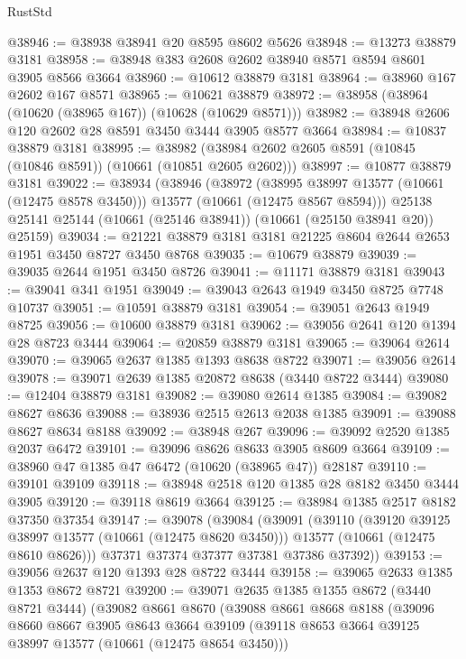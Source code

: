 \begin{lexlean}{RustStd}
\begin{coremodule}
@38946 := @38938 @38941 @20 @8595 @8602 @5626
@38948 := @13273 @38879 @3181
@38958 := @38948 @383 @2608 @2602 @38940 @8571 @8594 @8601 @3905 @8566 @3664
@38960 := @10612 @38879 @3181
@38964 := @38960 @167 @2602 @167 @8571
@38965 := @10621 @38879
@38972 := @38958 (@38964 (@10620 (@38965 @167)) (@10628 (@10629 @8571)))
@38982 := @38948 @2606 @120 @2602 @28 @8591 @3450 @3444 @3905 @8577 @3664
@38984 := @10837 @38879 @3181
@38995 := @38982 (@38984 @2602 @2605 @8591 (@10845 (@10846 @8591)) (@10661 (@10851 @2605 @2602)))
@38997 := @10877 @38879 @3181
@39022 := @38934
    (@38946
      (@38972
        (@38995 @38997 @13577 (@10661 (@12475 @8578 @3450)))
        @13577
        (@10661 (@12475 @8567 @8594)))
      @25138
      @25141
      @25144
      (@10661 (@25146 @38941))
      (@10661 (@25150 @38941 @20))
      @25159)
@39034 := @21221 @38879 @3181 @3181 @21225 @8604 @2644 @2653 @1951 @3450 @8727 @3450 @8768
@39035 := @10679 @38879
@39039 := @39035 @2644 @1951 @3450 @8726
@39041 := @11171 @38879 @3181
@39043 := @39041 @341 @1951
@39049 := @39043 @2643 @1949 @3450 @8725 @7748 @10737
@39051 := @10591 @38879 @3181
@39054 := @39051 @2643 @1949 @8725
@39056 := @10600 @38879 @3181
@39062 := @39056 @2641 @120 @1394 @28 @8723 @3444
@39064 := @20859 @38879 @3181
@39065 := @39064 @2614
@39070 := @39065 @2637 @1385 @1393 @8638 @8722
@39071 := @39056 @2614
@39078 := @39071 @2639 @1385 @20872 @8638 (@3440 @8722 @3444)
@39080 := @12404 @38879 @3181
@39082 := @39080 @2614 @1385
@39084 := @39082 @8627 @8636
@39088 := @38936 @2515 @2613 @2038 @1385
@39091 := @39088 @8627 @8634 @8188
@39092 := @38948 @267
@39096 := @39092 @2520 @1385 @2037 @6472
@39101 := @39096 @8626 @8633 @3905 @8609 @3664
@39109 := @38960 @47 @1385 @47 @6472 (@10620 (@38965 @47)) @28187
@39110 := @39101 @39109
@39118 := @38948 @2518 @120 @1385 @28 @8182 @3450 @3444 @3905
@39120 := @39118 @8619 @3664
@39125 := @38984 @1385 @2517 @8182 @37350 @37354
@39147 := @39078
    (@39084
      (@39091
        (@39110
          (@39120 @39125 @38997 @13577 (@10661 (@12475 @8620 @3450)))
          @13577
          (@10661 (@12475 @8610 @8626)))
        @37371
        @37374
        @37377
        @37381
        @37386
        @37392))
@39153 := @39056 @2637 @120 @1393 @28 @8722 @3444
@39158 := @39065 @2633 @1385 @1353 @8672 @8721
@39200 := @39071
    @2635
    @1385
    @1355
    @8672
    (@3440 @8721 @3444)
    (@39082
      @8661
      @8670
      (@39088
        @8661
        @8668
        @8188
        (@39096
          @8660
          @8667
          @3905
          @8643
          @3664
          @39109
          (@39118 @8653 @3664 @39125 @38997 @13577 (@10661 (@12475 @8654 @3450)))

\end{coremodule}
\end{lexlean}
